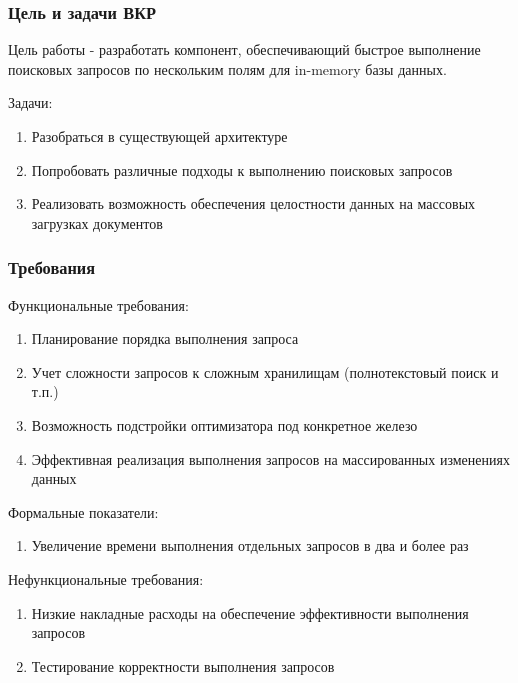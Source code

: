 \documentclass{beamer}
\begin{document}
\begin{frame}\frametitle{Цель и задачи ВКР}
    Цель работы - разработать компонент, обеспечивающий быстрое выполнение поисковых запросов по нескольким полям для in-memory базы данных.
    
    Задачи:
    \begin{enumerate}
        \item Разобраться в существующей архитектуре
        \item Попробовать различные подходы к выполнению поисковых запросов
        \item Реализовать возможность обеспечения целостности данных на массовых загрузках документов
    \end{enumerate}
\end{frame}

\begin{frame}\frametitle{Требования}
    Функциональные требования:
        \begin{enumerate}\itemsep0pt \parskip0pt 
            \item Планирование порядка выполнения запроса
            \item Учет сложности запросов к сложным хранилищам (полнотекстовый поиск и т.п.)
            \item Возможность подстройки оптимизатора под конкретное железо
            \item Эффективная реализация выполнения запросов на массированных изменениях данных
        \end{enumerate}
    Формальные показатели:
        \begin{enumerate}\itemsep0pt \parskip0pt  
            \item Увеличение времени выполнения отдельных запросов в два и более раз
        \end{enumerate}
    Нефункциональные требования:
        \begin{enumerate}\itemsep0pt \parskip0pt  
                \item Низкие накладные расходы на обеспечение эффективности выполнения запросов
                \item Тестирование корректности выполнения запросов
        \end{enumerate}
\end{frame}


\end{document}

